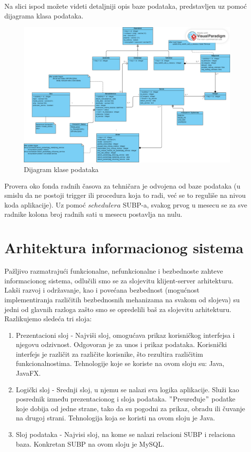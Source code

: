\documentclass[a4paper]{article}
\begin{document}
Na slici ispod možete videti detaljniji opis baze podataka, predstavljen uz pomoć dijagrama klasa podataka.

\begin{figure}[H]
\begin{center}
\includegraphics[scale=0.6, width = 1.2\textwidth]{Dijagrami/Dijagram_klasa_podataka/Dijagram_klasa_podataka.png}
\end{center}
\caption{Dijagram klase podataka}
\label{fig:dks}
\end{figure}

Provera oko fonda radnih časova za tehničara je odvojena od baze podataka (u smislu da ne postoji trigger ili procedura koja to radi, već se to reguliše na nivou koda aplikacije). Uz pomoć $schedulera$ SUBP-a, svakog prvog u mesecu se za sve radnike kolona broj radnih sati u mesecu postavlja na nulu.

\section{Arhitektura informacionog sistema}
\label{sec:arhitektura}
Pažljivo razmatrajući funkcionalne, nefunkcionalne i bezbednoste zahteve informacionog sistema, odlučili smo se za slojevitu klijent-server arhitekturu. Lakši razvoj i održavanje, kao i povećana bezbednost (mogućnost implementiranja različitih bezbednosnih mehanizama na svakom od slojeva) su jedni od glavnih razloga zašto smo se opredelili baš za slojevitu arhitekturu. Razlikujemo sledeća tri sloja:
\begin{enumerate}
    \item Prezentacioni sloj - Najviši sloj, omogućava prikaz korisničkog interfejsa i njegovu odzivnost. Odgovoran je za unos i prikaz podataka. Korisnički interfejs je različit za različite korisnike, što rezultira različitim funkcionalnostima. Tehnologije koje se koriste na ovom sloju su: Java, JavaFX.
    \item Logički sloj - Srednji sloj, u njemu se nalazi sva logika aplikacije. Služi kao posrednik između prezentacionog i sloja podataka. $"$Preuređuje$"$ podatke koje dobija od jedne strane, tako da su pogodni za prikaz, obradu ili čuvanje na drugoj strani. Tehnologija koja se koristi na ovom sloju je Java.
    \item Sloj podataka - Najvisi sloj, na kome se nalazi relacioni SUBP i relaciona baza. Konkretan SUBP na ovom sloju je MySQL.
\end{enumerate}
\end{document}
